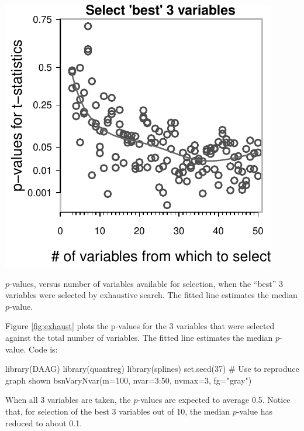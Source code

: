 \begin{marginfigure}
\begin{Schunk}


\centerline{\includegraphics[width=\textwidth]{figs/8-bsnVary-1} }

\end{Schunk}
\caption{$p$-values, versus number of variables available for selection,
  when the ``best'' 3 variables were selected by exhaustive search.
  The fitted line estimates the median $p$-value.\label{fig:exhaust}}
\end{marginfigure}
\noindent

Figure \ref{fig:exhaust} plots the p-values for the 3 variables that
were selected against the total number of variables. The fitted line
estimates the median $p$-value.
Code is:
\begin{Schunk}
\begin{Sinput}
library(DAAG)
library(quantreg)
library(splines)
set.seed(37)   # Use to reproduce graph shown
bsnVaryNvar(m=100, nvar=3:50, nvmax=3, fg="gray")
\end{Sinput}
\end{Schunk}

When all 3 variables are taken, the $p$-values are expected to average
0.5.  Notice that, for selection of the best 3 variables out of 10,
the median $p$-value has reduced to about 0.1.

